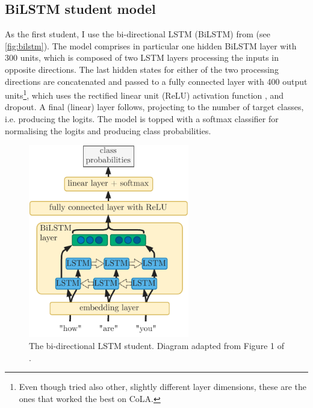 \documentclass[bsc,frontabs,twoside,singlespacing,parskip,deptreport]{infthesis}
\begin{document}
{{    \subsection{BiLSTM student model}{
      \label{sec:student-bilstm}
      As the first student, I use the bi-directional LSTM (BiLSTM) from \citeauthor{Tang_2019b} (see \autoref{fig:bilstm}). The model comprises in particular one hidden BiLSTM layer with 300 units, which is composed of two LSTM layers processing the inputs in opposite directions. The last hidden states for either of the two processing directions are concatenated and passed to a fully connected layer with 400 output units\footnote{Even though \citeauthor{Tang_2019b} tried also other, slightly different layer dimensions, these are the ones that worked the best on CoLA.}, which uses the rectified linear unit (ReLU) activation function \citep{Nair_2010}, and dropout. A final (linear) layer follows, projecting to the number of target classes, i.e. producing the logits. The model is topped with a softmax classifier for normalising the logits and producing class probabilities.
      \begin{figure}[h!t]
        \centering
        \includegraphics[width=7cm]{graphics/bilstm}
        \caption{The bi-directional LSTM student. Diagram adapted from Figure 1 of \citet{Tang_2019a}.}
        \label{fig:bilstm}
      \end{figure}

}}}
\end{document}
